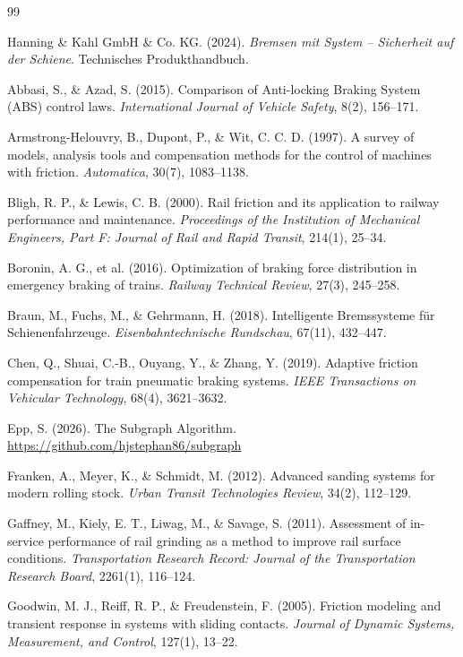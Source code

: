 \documentclass[a4paper,12pt]{article}
\theoremstyle{definition}
\theoremstyle{remark}
\begin{document}
\begin{thebibliography}{99}

 Hanning \& Kahl GmbH \& Co. KG. (2024). \textit{Bremsen mit System -- Sicherheit auf der Schiene}. Technisches Produkthandbuch.

 Abbasi, S., \& Azad, S. (2015). Comparison of Anti-locking Braking System (ABS) control laws. \textit{International Journal of Vehicle Safety}, 8(2), 156--171.

 Armstrong-Helouvry, B., Dupont, P., \& Wit, C. C. D. (1997). A survey of models, analysis tools and compensation methods for the control of machines with friction. \textit{Automatica}, 30(7), 1083--1138.

 Bligh, R. P., \& Lewis, C. B. (2000). Rail friction and its application to railway performance and maintenance. \textit{Proceedings of the Institution of Mechanical Engineers, Part F: Journal of Rail and Rapid Transit}, 214(1), 25--34.

 Boronin, A. G., et al. (2016). Optimization of braking force distribution in emergency braking of trains. \textit{Railway Technical Review}, 27(3), 245--258.

 Braun, M., Fuchs, M., \& Gehrmann, H. (2018). Intelligente Bremssysteme für Schienenfahrzeuge. \textit{Eisenbahntechnische Rundschau}, 67(11), 432--447.

 Chen, Q., Shuai, C.-B., Ouyang, Y., \& Zhang, Y. (2019). Adaptive friction compensation for train pneumatic braking systems. \textit{IEEE Transactions on Vehicular Technology}, 68(4), 3621--3632.

 Epp, S. (2026). The Subgraph Algorithm. \url{https://github.com/hjstephan86/subgraph}

 Franken, A., Meyer, K., \& Schmidt, M. (2012). Advanced sanding systems for modern rolling stock. \textit{Urban Transit Technologies Review}, 34(2), 112--129.

 Gaffney, M., Kiely, E. T., Liwag, M., \& Savage, S. (2011). Assessment of in-service performance of rail grinding as a method to improve rail surface conditions. \textit{Transportation Research Record: Journal of the Transportation Research Board}, 2261(1), 116--124.

 Goodwin, M. J., Reiff, R. P., \& Freudenstein, F. (2005). Friction modeling and transient response in systems with sliding contacts. \textit{Journal of Dynamic Systems, Measurement, and Control}, 127(1), 13--22.


\end{thebibliography}
\end{document}
